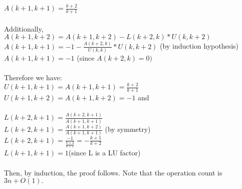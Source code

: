 \documentclass{article}
\begin{document}
\indent \(A(k+1,k+1)= \frac{k+2}{k+1} \)\\\\
Additionally, \\
\indent \(A(k+1,k+2)= A(k+1,k+2) - L(k+2,k)*U(k,k+2)\)\\
\indent \(A(k+1,k+1)= -1 - \frac{A(k+2,k)}{U(k,k)}*U(k,k+2) \) \indent (by induction hypothesis)\\
\indent \(A(k+1,k+1)= -1 \) \indent  (since \(A(k+2,k)=0)\)\\\\
Therefore we have:\\
\indent \(U(k+1,k+1) = A(k+1,k+1) = \frac{k+2}{k+1}\)\\
\indent \(U(k+1,k+2)=A(k+1,k+2) = -1\) \indent and \\\\
\indent \(L(k+2,k+1) = \frac{A(k+2,k+1)}{A(k+1,k+1)}\)\\
\indent \(L(k+2,k+1) = \frac{A(k+1,k+2)}{A(k+1,k+1)}\) \indent (by symmetry)\\
\indent \(L(k+2,k+1) = \frac{-1}{\frac{k+2}{k+1}} = -\frac{k+1}{k+2}\)\\
\indent \(L(k+1,k+1)=1 \)\indent (since L is a LU factor)\\\\
Then, by induction, the proof follows. Note that the operation count is \(3n + O(1).\)

\newpage{}
\end{document}
